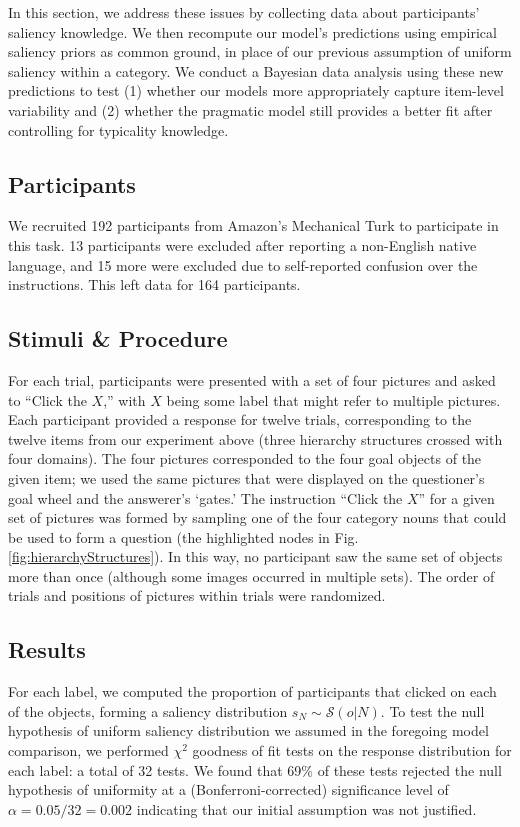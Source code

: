 \documentclass[12pt, floatsintext, jou]{apa6}
\begin{document}
In this section, we address these issues by collecting data about participants' saliency knowledge. We then recompute our model's predictions using empirical saliency priors as common ground, in  place of our previous assumption of uniform saliency within a category. We conduct a Bayesian data analysis using these new predictions to test (1) whether our models more appropriately capture item-level variability and (2) whether the pragmatic model still provides a better fit after controlling for typicality knowledge.

\subsection{Participants} 
We recruited 192 participants from Amazon's Mechanical Turk to participate in this task. 13 participants were excluded after reporting a non-English native language, and 15 more were excluded due to self-reported confusion over the instructions. This left data for 164 participants.

\subsection{Stimuli \& Procedure}
For each trial, participants were presented with a set of four pictures and asked to ``Click the $X$,'' with $X$ being some label that might refer to multiple pictures. Each participant provided a response for twelve trials, corresponding to the twelve items from our experiment above (three hierarchy structures crossed with four domains). The four pictures corresponded to the four goal objects of the given item; we used the same pictures that were displayed on the questioner's goal wheel and the answerer's `gates.' The instruction ``Click the $X$'' for a given set of pictures was formed by sampling one of the four category nouns that could be used to form a question (the highlighted nodes in Fig. \ref{fig:hierarchyStructures}). In this way, no participant saw the same set of objects more than once (although some images occurred in multiple sets). The order of trials and positions of pictures within trials were randomized.

\subsection{Results}

For each label, we computed the proportion of participants that clicked on each of the objects, forming a saliency distribution $s_N \sim \mathcal{S}(o | N)$. To test the null hypothesis of uniform saliency distribution we assumed in the foregoing model comparison, we performed $\chi^2$ goodness of fit tests on the response distribution for each label: a total of 32 tests. We found that 69\% of these tests rejected the null hypothesis of uniformity at a (Bonferroni-corrected) significance level of $\alpha = 0.05/32 = 0.002$ indicating that our initial assumption was not justified. 
\end{document}

